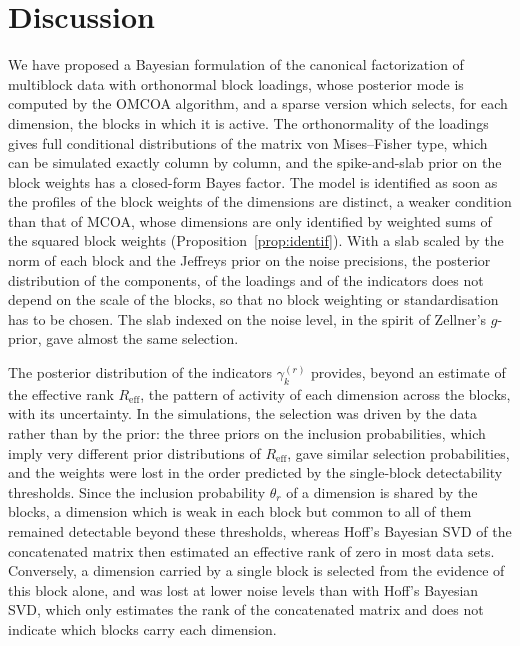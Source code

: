 \documentclass[11pt]{article}
\newcommand{\Reff}{R_{\mathrm{eff}}}
\begin{document}
\section{Discussion}\label{sec:discussion}
 
We have proposed a Bayesian formulation of the canonical factorization of multiblock data with orthonormal block loadings, whose posterior mode is computed by the OMCOA algorithm, and a sparse version which selects, for each dimension, the blocks in which it is active. The orthonormality of the loadings gives full conditional distributions of the matrix von Mises--Fisher type, which can be simulated exactly column by column, and the spike-and-slab prior on the block weights has a closed-form Bayes factor. The model is identified as soon as the profiles of the block weights of the dimensions are distinct, a weaker condition than that of MCOA, whose dimensions are only identified by weighted sums of the squared block weights (Proposition~\ref{prop:identif}). With a slab scaled by the norm of each block and the Jeffreys prior on the noise precisions, the posterior distribution of the components, of the loadings and of the indicators does not depend on the scale of the blocks, so that no block weighting or standardisation has to be chosen. The slab indexed on the noise level, in the spirit of Zellner's $g$-prior, gave almost the same selection.
 
The posterior distribution of the indicators $\gamma_k^{(r)}$ provides, beyond an estimate of the effective rank $\Reff$, the pattern of activity of each dimension across the blocks, with its uncertainty. In the simulations, the selection was driven by the data rather than by the prior: the three priors on the inclusion probabilities, which imply very different prior distributions of $\Reff$, gave similar selection probabilities, and the weights were lost in the order predicted by the single-block detectability thresholds. Since the inclusion probability $\theta_r$ of a dimension is shared by the blocks, a dimension which is weak in each block but common to all of them remained detectable beyond these thresholds, whereas Hoff's Bayesian SVD of the concatenated matrix then estimated an effective rank of zero in most data sets. Conversely, a dimension carried by a single block is selected from the evidence of this block alone, and was lost at lower noise levels than with Hoff's Bayesian SVD, which only estimates the rank of the concatenated matrix and does not indicate which blocks carry each dimension.
 
\end{document}
